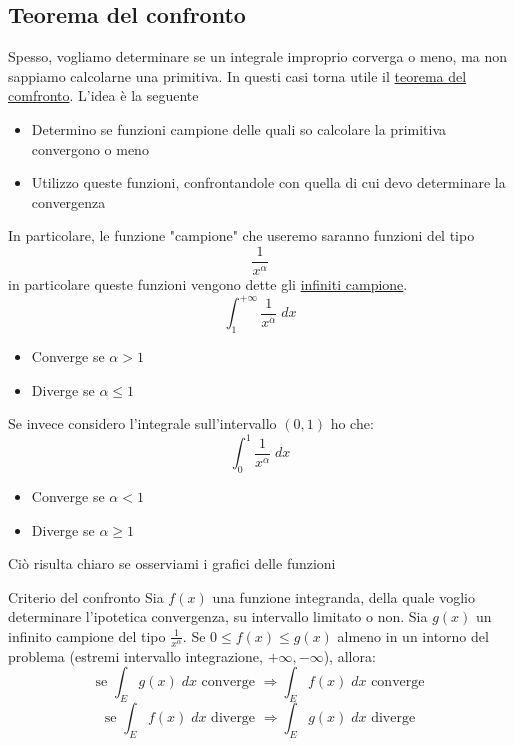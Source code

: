 \subsection{Teorema del confronto}
Spesso, vogliamo determinare se un integrale improprio corverga o meno, ma non sappiamo calcolarne una primitiva. In questi casi torna utile il \underline{teorema del comfronto}. L'idea è la seguente
\begin{itemize}
	\item Determino se funzioni campione delle quali so calcolare la primitiva convergono o meno
	\item Utilizzo queste funzioni, confrontandole con quella di cui devo determinare la convergenza
\end{itemize}
In particolare, le funzione "campione" che useremo saranno funzioni del tipo
\[
	\frac{1}{x^{\alpha }}
\]
in particolare queste funzioni vengono dette gli \underline{infiniti campione}.
\[
	\int_{1}^{+\infty} \frac{1}{x^{\alpha }} \; dx
\]
\begin{itemize}
	\item Converge se $ \alpha  >1 $
	\item Diverge se $ \alpha \le 1 $
\end{itemize}
Se invece considero l'integrale sull'intervallo $ \left( 0,1 \right)  $ ho che:
\[
	\int_{0}^{1} \frac{1}{x^{\alpha }} \; dx
\]
\begin{itemize}
	\item Converge se $ \alpha < 1 $
	\item Diverge se $ \alpha  \ge 1 $
\end{itemize}
Ciò risulta chiaro se osserviami i grafici delle funzioni
\begin{center}
\end{center}
\begin{teorema}{Criterio del confronto}
	Sia $ f\left( x \right)  $ una funzione integranda, della quale voglio determinare l'ipotetica convergenza, su intervallo limitato o non. Sia $ g\left( x \right)  $ un infinito campione del tipo $ \frac{1}{x^{\alpha }} $. Se $ 0 \le f\left( x \right) \le g\left( x \right)  $ almeno in un intorno del problema (estremi intervallo integrazione, $ +\infty, - \infty $), allora:
	\[
		\text{ se }\int_{E} g\left( x \right)  \; dx \text{ converge } \Rightarrow \int_{E} f\left( x \right) \; dx \text{ converge }
	\]
	\[
		\text{ se }\int_{E} f\left( x \right)  \; dx \text{ diverge } \Rightarrow \int_{E} g\left( x \right) \; dx \text{ diverge }
	\]

\end{teorema}

